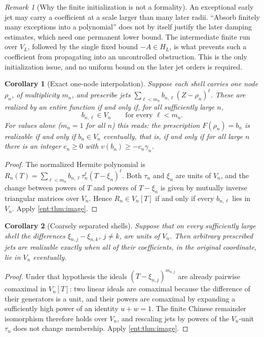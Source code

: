 \documentclass[11pt]{article}
\theoremstyle{plain}
\theoremstyle{plain}
\theoremstyle{plain}
\newtheorem{corollary}[corollary]{Corollary}
\theoremstyle{definition}
\theoremstyle{definition}
\theoremstyle{definition}
\theoremstyle{definition}
\theoremstyle{remark}
\newtheorem{remark}[remark]{Remark}
\begin{document}
\begin{remark}[Why the finite initialization is not a formality]
An exceptional early jet may carry a coefficient at a scale larger than many
later radii. ``Absorb finitely many exceptions into a polynomial'' does not by
itself justify the later damping estimates, which need one permanent lower
bound. The intermediate finite run over $V_L$, followed by the single fixed
bound $-A\in H_L$, is what prevents such a coefficient from propagating into
an uncontrolled obstruction. This is the only initialization issue, and no
uniform bound on the later jet orders is required.
\end{remark}

\begin{corollary}[Exact one-node interpolation]\label{ent:cor:single-node}
Suppose each shell carries one node $\rho_n$, of multiplicity $m_n$, and
prescribe jets $\sum_{\ell<m_n}b_{n,\ell}(Z-\rho_n)^\ell$. These are realized
by an entire function if and only if, for all sufficiently large $n$,
\[
 b_{n,\ell}\in V_n\qquad\text{for every }\ell<m_n .
\]
For values alone ($m_n=1$ for all $n$) this reads: the prescription
$F(\rho_n)=b_n$ is realizable if and only if $b_n\in V_n$ eventually, that is,
if and only if for all large $n$ there is an integer $c_n\ge0$ with
$v(b_n)\ge-c_n\gamma_n$.
\end{corollary}
\begin{proof}
The normalized Hermite polynomial is
$R_n(T)=\sum_{\ell<m_n}b_{n,\ell}\tau_n^\ell(T-\xi_n)^\ell$. Both $\tau_n$ and
$\xi_n$ are units of $V_n$, and the change between powers of $T$ and powers of
$T-\xi_n$ is given by mutually inverse triangular matrices over $V_n$. Hence
$R_n\in V_n[T]$ if and only if every $b_{n,\ell}$ lies in $V_n$. Apply
\cref{ent:thm:image}.
\end{proof}

\begin{corollary}[Coarsely separated shells]\label{ent:cor:coarse-separated}
Suppose that on every sufficiently large shell the differences
$\xi_{n,j}-\xi_{n,k}$, $j\ne k$, are units of $V_n$. Then arbitrary
prescribed jets are realizable exactly when all of their coefficients, in the
original coordinate, lie in $V_n$ eventually.
\end{corollary}
\begin{proof}
Under that hypothesis the ideals $(T-\xi_{n,j})^{m_{n,j}}$ are already
pairwise comaximal in $V_n[T]$: two linear ideals are comaximal because the
difference of their generators is a unit, and their powers are comaximal by
expanding a sufficiently high power of an identity $u+w=1$. The finite
Chinese remainder isomorphism therefore holds over $V_n$, and rescaling jets
by powers of the $V_n$-unit $\tau_n$ does not change membership. Apply
\cref{ent:thm:image}.
\end{proof}
\end{document}
